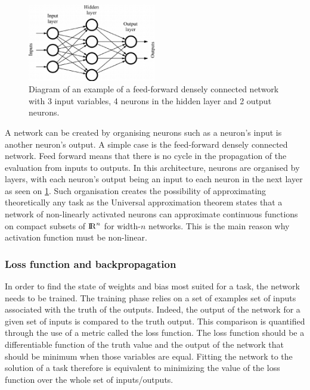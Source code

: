 \begin{figure}
    \centering
    \includegraphics[width=0.5\textwidth]{Images/dense_network.png}
    \caption{Diagram of an example of a feed-forward densely connected network with 3 input variables, 4 neurons in the hidden layer and 2 output neurons.}
    \label{fig:dense_network}
\end{figure}

A network can be created by organising neurons such as a neuron's input is another neuron's output.
A simple case is the feed-forward densely connected network.
Feed forward means that there is no cycle in the propagation of the evaluation from inputs to outputs.
In this architecture, neurons are organised by layers, with each neuron's output being an input to each neuron in the next layer as seen on \ref{fig:dense_network}. Such organisation creates the possibility of approximating theoretically any task as the Universal approximation theorem states that a network of non-linearly activated neurons can approximate continuous functions on compact subsets of ${\rm I\!R}^{n}$ for width-$n$ networks. This is the main reason why activation function must be non-linear. 

\subsubsection{Loss function and backpropagation}

In order to find the state of weights and bias most suited for a task, the network needs to be trained.
The training phase relies on a set of examples set of inputs associated with the truth of the outputs. Indeed, the output of the network for a given set of inputs is compared to the truth output. This comparison is quantified through the use of a metric called the loss function. The loss function should be a differentiable function of the truth value and the output of the network that should be minimum when those variables are equal. Fitting the network to the solution of a task therefore is equivalent to minimizing the value of the loss function over the whole set of inputs/outputs.

